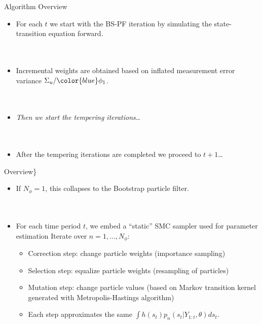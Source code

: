 \documentclass[presentation]{beamer}
\begin{document}
\begin{frame}[label={sec:orgbb1c5b1}]{Algorithm Overview}
\begin{itemize}
\item For each \(t\) we start with the BS-PF iteration by simulating the state-transition equation forward.
\\~\\~
\item Incremental weights are obtained based on \alert{inflated measurement error variance} \(\Sigma_u/{\color{blue}\phi_1}\).
\\~\\~
\item \emph{Then we start the tempering iterations}\ldots{}
\\~\\~
\item After the tempering iterations are completed we proceed to \(t+1\)\ldots{}
\end{itemize}
\end{frame}

\begin{frame}[label={sec:org56e9663}]{Overview\}}
\begin{itemize}
\item If \(N_{\phi} = 1\), this collapses to the Bootstrap particle filter.
\\~\\~
\item For each time period \(t\), we embed a ``static'' SMC sampler used for parameter estimation
Iterate over \(n=1,\ldots,N_\phi\):
\begin{itemize}
\item \alert{Correction step}:  change particle weights (importance sampling)
\item \alert{Selection step}: equalize particle weights (resampling of particles)
\item \alert{Mutation step}: change particle values (based on Markov transition kernel generated with Metropolis-Hastings algorithm)
\item Each step approximates the same \(\int h(s_t) p_n(s_{t}|Y_{1:t},\theta) ds_t\).
\end{itemize}
\end{itemize}
\end{frame}
\end{document}
